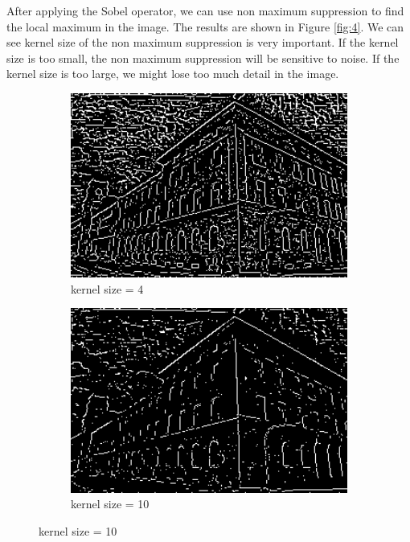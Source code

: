 \documentclass[12pt
,headinclude
,headsepline
,bibtotocnumbered
]{scrartcl}
\begin{document}
After applying the Sobel operator, we can use non maximum suppression to find the local maximum in the image. The results are shown in Figure \ref{fig:4}. We can see kernel size of the non maximum suppression is very important. If the kernel size is too small, the non maximum suppression will be sensitive to noise. If the kernel size is too large, we might lose too much detail in the image.  
\begin{figure}[H]
    \centering
    \begin{subfigure}{0.45\textwidth}
        \includegraphics[width=1\textwidth]{plots/edges_4.png}
        \caption*{kernel size = 4}
    \end{subfigure}
    \hfill
    \begin{subfigure}{0.45\textwidth}
        \includegraphics[width=1\textwidth]{plots/edges_10.png}
        \caption*{kernel size = 10}
    \end{subfigure}

\end{figure}
\end{document}
